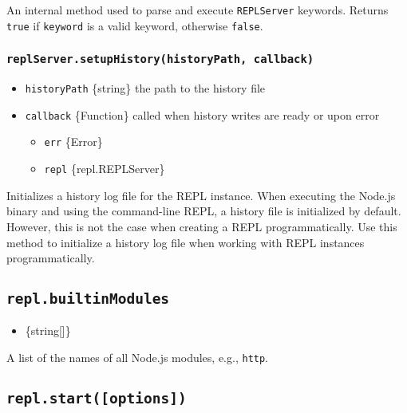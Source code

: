 An internal method used to parse and execute \texttt{REPLServer}
keywords. Returns \texttt{true} if \texttt{keyword} is a valid keyword,
otherwise \texttt{false}.

\subsubsection{\texorpdfstring{\texttt{replServer.setupHistory(historyPath,\ callback)}}{replServer.setupHistory(historyPath, callback)}}\label{replserver.setuphistoryhistorypath-callback}

\begin{itemize}
\tightlist
\item
  \texttt{historyPath} \{string\} the path to the history file
\item
  \texttt{callback} \{Function\} called when history writes are ready or
  upon error

  \begin{itemize}
  \tightlist
  \item
    \texttt{err} \{Error\}
  \item
    \texttt{repl} \{repl.REPLServer\}
  \end{itemize}
\end{itemize}

Initializes a history log file for the REPL instance. When executing the
Node.js binary and using the command-line REPL, a history file is
initialized by default. However, this is not the case when creating a
REPL programmatically. Use this method to initialize a history log file
when working with REPL instances programmatically.

\subsection{\texorpdfstring{\texttt{repl.builtinModules}}{repl.builtinModules}}\label{repl.builtinmodules}

\begin{itemize}
\tightlist
\item
  \{string{[}{]}\}
\end{itemize}

A list of the names of all Node.js modules, e.g.,
\texttt{\textquotesingle{}http\textquotesingle{}}.

\subsection{\texorpdfstring{\texttt{repl.start({[}options{]})}}{repl.start({[}options{]})}}\label{repl.startoptions}

